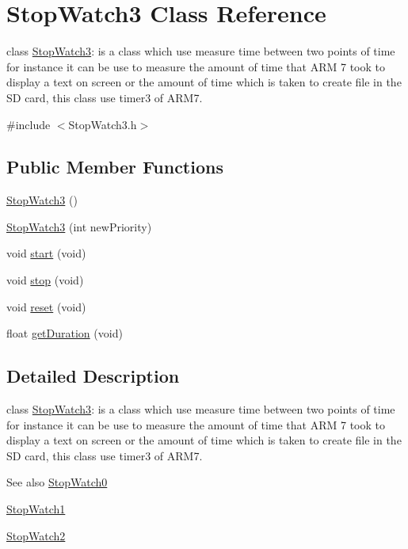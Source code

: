 \hypertarget{class_stop_watch3}{
\section{StopWatch3 Class Reference}
\label{d2/d7e/class_stop_watch3}
}


class \hyperlink{class_stop_watch3}{StopWatch3}: is a class which use measure time between two points of time for instance it can be use to measure the amount of time that ARM 7 took to display a text on screen or the amount of time which is taken to create file in the SD card, this class use timer3 of ARM7.  




{\ttfamily \#include $<$StopWatch3.h$>$}

\subsection*{Public Member Functions}
\begin{DoxyCompactItemize}
\item 
\hyperlink{class_stop_watch3_a54551daace0becd03230b2591765a562}{StopWatch3} ()
\item 
\hyperlink{class_stop_watch3_a430d629e09f8bf59bb5b95a0c78514de}{StopWatch3} (int newPriority)
\item 
void \hyperlink{class_stop_watch3_a7b4ea089f7de58c1f855880a832f131b}{start} (void)
\item 
void \hyperlink{class_stop_watch3_ae437886d39413ec6b184f94966bd3b0b}{stop} (void)
\item 
void \hyperlink{class_stop_watch3_a10d6059cbbe7155f73d3c9e0af0603b4}{reset} (void)
\item 
float \hyperlink{class_stop_watch3_a909e9c2f1a085ea81c2f3cf2319bb715}{getDuration} (void)
\end{DoxyCompactItemize}


\subsection{Detailed Description}
class \hyperlink{class_stop_watch3}{StopWatch3}: is a class which use measure time between two points of time for instance it can be use to measure the amount of time that ARM 7 took to display a text on screen or the amount of time which is taken to create file in the SD card, this class use timer3 of ARM7. 

\begin{DoxySeeAlso}{See also}
\hyperlink{class_stop_watch0}{StopWatch0} 

\hyperlink{class_stop_watch1}{StopWatch1} 

\hyperlink{class_stop_watch2}{StopWatch2} 
\end{DoxySeeAlso}


